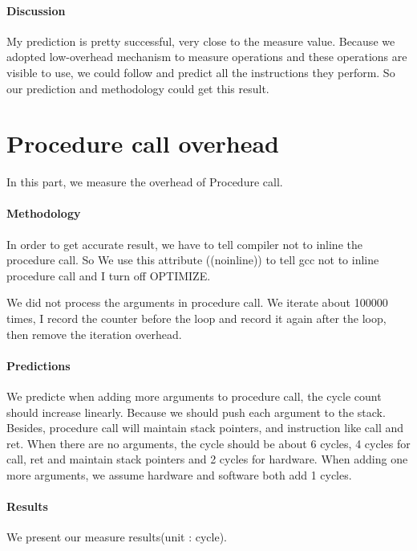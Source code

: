 \paragraph{Discussion}
My prediction is pretty successful, very close to the measure value. Because we adopted low-overhead mechanism to measure operations and these operations are visible to use, we could follow and predict all the instructions they perform. So our prediction and methodology could get this result. 

\section{Procedure call overhead}
In this part, we measure the overhead of Procedure call. 

\paragraph{Methodology}
In order to get accurate result, we have to tell compiler not to inline the procedure call. So We use this attribute ((noinline)) to tell gcc not to inline procedure call and I turn off OPTIMIZE.

We did not process the arguments in procedure call. We iterate about 100000 times, I record the counter before the loop and record it again after the loop, then remove the iteration overhead.

\paragraph{Predictions}
We predicte when adding more arguments to procedure call, the cycle count should increase linearly. Because we should push each argument to the stack. Besides, procedure call will maintain stack pointers, and instruction like call and ret. When there are no arguments, the cycle should be about 6 cycles, 4 cycles for call, ret and maintain stack pointers and 2 cycles for hardware. When adding one more arguments, we assume hardware and software both add 1 cycles.


\paragraph{Results}
We present our measure results(unit : cycle).

